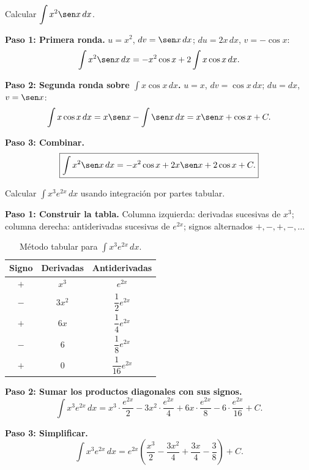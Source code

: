 \begin{example}
Calcular $\displaystyle\int x^2 \sen x\, dx$.

\begin{myproof}

\textbf{Paso 1: Primera ronda.}
$u = x^2$, $dv = \sen x\,dx$; $du = 2x\,dx$, $v = -\cos x$:
\[
\int x^2 \sen x\, dx = -x^2\cos x + 2\int x\cos x\, dx.
\]

\textbf{Paso 2: Segunda ronda sobre $\int x\cos x\,dx$.}
$u = x$, $dv = \cos x\,dx$; $du = dx$, $v = \sen x$:
\[
\int x\cos x\, dx = x\sen x - \int \sen x\, dx = x\sen x + \cos x + C.
\]

\textbf{Paso 3: Combinar.}
\[
\boxed{\int x^2 \sen x\, dx = -x^2\cos x + 2x\sen x + 2\cos x + C.}
\]
\end{myproof}
\end{example}

\begin{example}
Calcular $\displaystyle\int x^3 e^{2x}\, dx$ usando integración por partes tabular.

\begin{myproof}

\textbf{Paso 1: Construir la tabla.}
Columna izquierda: derivadas sucesivas de $x^3$; columna derecha: antiderivadas sucesivas de $e^{2x}$; signos alternados $+,-,+,-,\ldots$

\begin{table}[H]
\centering
\renewcommand{\arraystretch}{1.6}
\begin{tabular}{c c c}
\toprule
\textbf{Signo} & \textbf{Derivadas} & \textbf{Antiderivadas} \\
\midrule
$+$ & $x^3$ & $e^{2x}$ \\
$-$ & $3x^2$ & $\dfrac{1}{2}e^{2x}$ \\
$+$ & $6x$ & $\dfrac{1}{4}e^{2x}$ \\
$-$ & $6$ & $\dfrac{1}{8}e^{2x}$ \\
$+$ & $0$ & $\dfrac{1}{16}e^{2x}$ \\
\bottomrule
\end{tabular}
\caption{Método tabular para $\int x^3e^{2x}\,dx$.}
\end{table}

\textbf{Paso 2: Sumar los productos diagonales con sus signos.}
\[
\int x^3 e^{2x}\, dx
= x^3\cdot\frac{e^{2x}}{2}
- 3x^2\cdot\frac{e^{2x}}{4}
+ 6x\cdot\frac{e^{2x}}{8}
- 6\cdot\frac{e^{2x}}{16} + C.
\]

\textbf{Paso 3: Simplificar.}
\[
\boxed{\int x^3 e^{2x}\, dx = e^{2x}\!\left(\frac{x^3}{2} - \frac{3x^2}{4} + \frac{3x}{4} -
\frac{3}{8}\right) + C.}
\]
\end{myproof}
\end{example}

